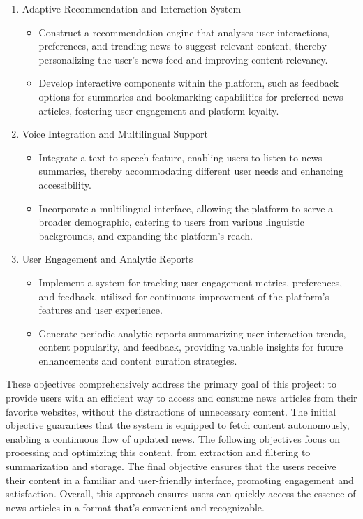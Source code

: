 \documentclass[a4paper]{article}
\begin{document}
\begin{enumerate}
\begin{itemize}
        \end{itemize}
    \item Adaptive Recommendation and Interaction System
        \begin{itemize}
            \item Construct a recommendation engine that analyses user interactions, preferences, and trending news to suggest relevant content, thereby personalizing the user's news feed and improving content relevancy.
            \item Develop interactive components within the platform, such as feedback options for summaries and bookmarking capabilities for preferred news articles, fostering user engagement and platform loyalty.
        \end{itemize}
    \item Voice Integration and Multilingual Support
        \begin{itemize}
            \item Integrate a text-to-speech feature, enabling users to listen to news summaries, thereby accommodating different user needs and enhancing accessibility.
            \item Incorporate a multilingual interface, allowing the platform to serve a broader demographic, catering to users from various linguistic backgrounds, and expanding the platform's reach.
        \end{itemize}
    \item User Engagement and Analytic Reports
        \begin{itemize}
            \item Implement a system for tracking user engagement metrics, preferences, and feedback, utilized for continuous improvement of the platform's features and user experience.
            \item Generate periodic analytic reports summarizing user interaction trends, content popularity, and feedback, providing valuable insights for future enhancements and content curation strategies.
        \end{itemize}
\end{enumerate}

\par These objectives comprehensively address the primary goal of this project: to provide users with an efficient way to access and consume news articles from their favorite websites, without the distractions of unnecessary content. The initial objective guarantees that the system is equipped to fetch content autonomously, enabling a continuous flow of updated news. The following objectives focus on processing and optimizing this content, from extraction and filtering to summarization and storage. The final objective ensures that the users receive their content in a familiar and user-friendly interface, promoting engagement and satisfaction. Overall, this approach ensures users can quickly access the essence of news articles in a format that's convenient and recognizable.
\end{document}
